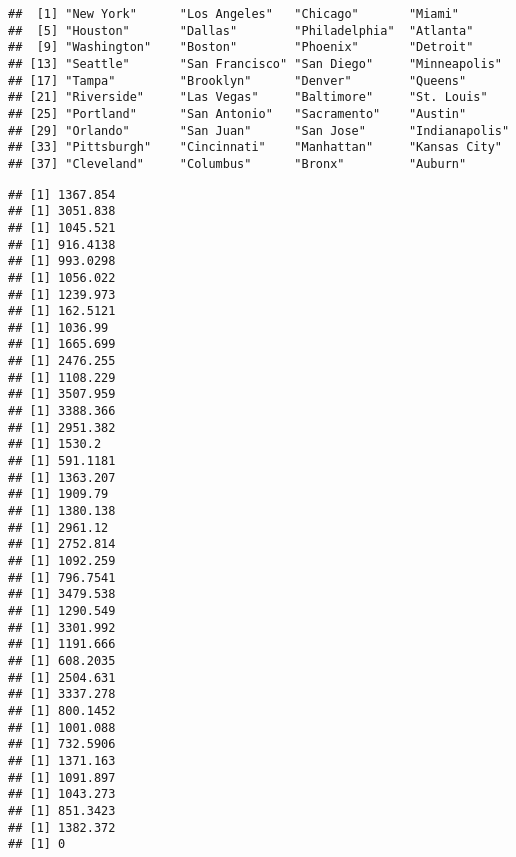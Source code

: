 \documentclass[
]{article}
\newenvironment{Shaded}{\begin{snugshade}}{\end{snugshade}}
\newcommand{\CommentTok}[1]{\textcolor[rgb]{0.56,0.35,0.01}{\textit{#1}}}
\newcommand{\ControlFlowTok}[1]{\textcolor[rgb]{0.13,0.29,0.53}{\textbf{#1}}}
\newcommand{\FunctionTok}[1]{\textcolor[rgb]{0.13,0.29,0.53}{\textbf{#1}}}
\newcommand{\NormalTok}[1]{#1}
\newcommand{\OtherTok}[1]{\textcolor[rgb]{0.56,0.35,0.01}{#1}}
\newcommand{\SpecialCharTok}[1]{\textcolor[rgb]{0.81,0.36,0.00}{\textbf{#1}}}
\begin{document}
\begin{Shaded}
\end{Shaded}

\begin{verbatim}
##  [1] "New York"      "Los Angeles"   "Chicago"       "Miami"        
##  [5] "Houston"       "Dallas"        "Philadelphia"  "Atlanta"      
##  [9] "Washington"    "Boston"        "Phoenix"       "Detroit"      
## [13] "Seattle"       "San Francisco" "San Diego"     "Minneapolis"  
## [17] "Tampa"         "Brooklyn"      "Denver"        "Queens"       
## [21] "Riverside"     "Las Vegas"     "Baltimore"     "St. Louis"    
## [25] "Portland"      "San Antonio"   "Sacramento"    "Austin"       
## [29] "Orlando"       "San Juan"      "San Jose"      "Indianapolis" 
## [33] "Pittsburgh"    "Cincinnati"    "Manhattan"     "Kansas City"  
## [37] "Cleveland"     "Columbus"      "Bronx"         "Auburn"
\end{verbatim}

\begin{Shaded}
\end{Shaded}

\begin{verbatim}
## [1] 1367.854
## [1] 3051.838
## [1] 1045.521
## [1] 916.4138
## [1] 993.0298
## [1] 1056.022
## [1] 1239.973
## [1] 162.5121
## [1] 1036.99
## [1] 1665.699
## [1] 2476.255
## [1] 1108.229
## [1] 3507.959
## [1] 3388.366
## [1] 2951.382
## [1] 1530.2
## [1] 591.1181
## [1] 1363.207
## [1] 1909.79
## [1] 1380.138
## [1] 2961.12
## [1] 2752.814
## [1] 1092.259
## [1] 796.7541
## [1] 3479.538
## [1] 1290.549
## [1] 3301.992
## [1] 1191.666
## [1] 608.2035
## [1] 2504.631
## [1] 3337.278
## [1] 800.1452
## [1] 1001.088
## [1] 732.5906
## [1] 1371.163
## [1] 1091.897
## [1] 1043.273
## [1] 851.3423
## [1] 1382.372
## [1] 0
\end{verbatim}
\end{document}
